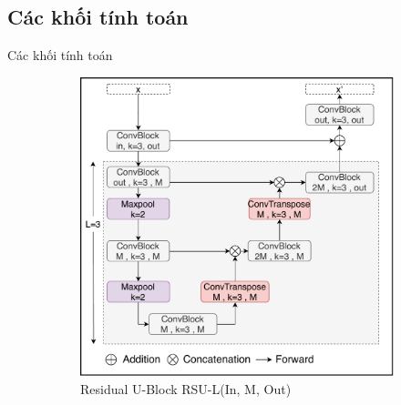 \documentclass[
	10pt,                %
	aspectratio=169,     %
]{beamer}
\begin{document}
\subsection{Các khối tính toán}
    \begin{frame}{Các khối tính toán}
        \begin{figure}[h!]
			\begin{subfigure}[b]{0.5\textwidth}
			    \centering	\includegraphics[scale=0.45]{figures/arch/RSU_L3.pdf}
				\caption{Residual U-Block RSU-L(In, M, Out)}
			\end{subfigure}
			\begin{subfigure}[b]{0.4\textwidth}

\end{subfigure}
\end{figure}
\end{frame}
\end{document}
